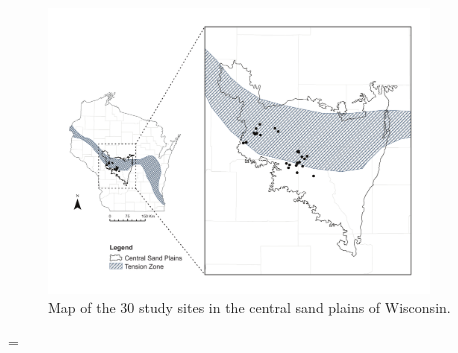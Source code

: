 \begin{figure}
\centering{}\includegraphics[width=0.9\textwidth]{chapter1/figures-maintext/map_20140214.pdf}\caption{\label{fig:Reampled-sites-in} Map of the 30 study sites in the central sand plains of Wisconsin.}
\end{figure}


\clearpage{}

\appendix

\renewcommand{\tablename}{\textsc{Table}}
\renewcommand {\thetable}{\textbf{A\arabic{table}}}
\renewcommand{\figurename}{\textsc{Fig.}}
\renewcommand {\thefigure}{\textbf{A\arabic{figure}}}
\setcounter{figure}{0}
\setcounter{table}{0}

\setlength{\tabcolsep}{2pt}
\LTcapwidth=\textwidth

